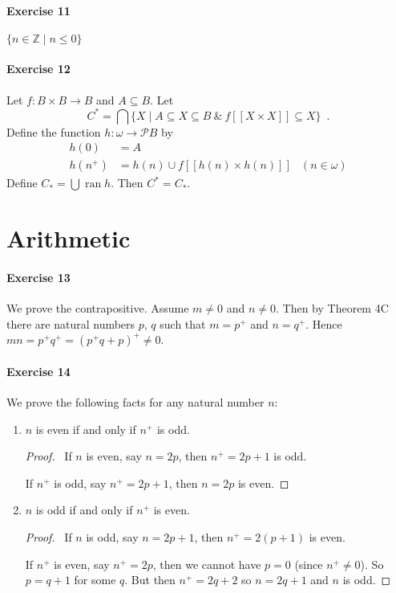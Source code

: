 \documentclass{report}
\newcommand{\ran}{\ensuremath{\operatorname{ran}}}
\begin{document}
    \paragraph{Exercise 11}
    $\{ n \in \mathbb{Z} \mid n \leq 0 \}$

    \paragraph{Exercise 12}
    Let $f : B \times B \rightarrow B$ and $A \subseteq B$. Let
    \[ C^* = \bigcap \{ X \mid A \subseteq X \subseteq B\ \&\ f[\![X \times X]\!] \subseteq X \} \enspace . \]
    Define the function $h : \omega \rightarrow \mathcal{P} B$ by
    \begin{align*}
        h(0) & = A \\
        h(n^+) & = h(n) \cup f[\![h(n) \times h(n)]\!] & (n \in \omega)
    \end{align*}
    Define $C_* = \bigcup \ran h$. Then $C^* = C_*$.

    \section{Arithmetic}

    \paragraph{Exercise 13}
    We prove the contrapositive. Assume $m \neq 0$ and $n \neq 0$. Then by Theorem 4C
    there are natural numbers $p$, $q$ such that $m = p^+$ and $n = q^+$. Hence
    $mn = p^+ q^+ = (p^+ q + p)^+ \neq 0$.

    \paragraph{Exercise 14}
    We prove the following facts for any natural number $n$:

    \begin{enumerate}
        \item $n$ is even if and only if $n^+$ is odd.
        \begin{proof}
            \pf\ If $n$ is even, say $n = 2p$, then $n^+ = 2p+1$ is odd.

            If $n^+$ is odd, say $n^+ = 2p+1$, then $n = 2p$ is even.
        \end{proof}
        \item $n$ is odd if and only if $n^+$ is even.
        \begin{proof}
            \pf\ If $n$ is odd, say $n = 2p+1$, then $n^+ = 2(p+1)$ is even.

            If $n^+$ is even, say $n^+ = 2p$, then we cannot have $p = 0$ (since $n^+ \neq 0$).
            So $p = q + 1$ for some $q$. But then $n^+ = 2q+2$ so $n = 2q+1$ and $n$ is odd.
        \end{proof}
    \end{enumerate}
\end{document}
